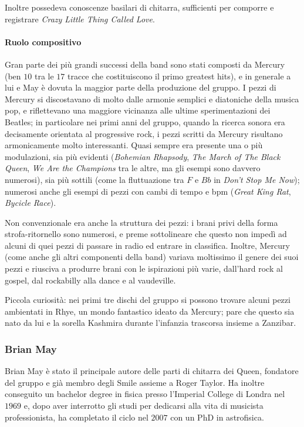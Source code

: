 \documentclass[12pt]{article}
\begin{document}
Inoltre possedeva conoscenze basilari di chitarra, sufficienti per comporre e registrare \emph{Crazy Little Thing Called Love}.

\paragraph{Ruolo compositivo}
Gran parte dei più grandi successi della band sono stati composti da Mercury (ben \(10\) tra le \(17\) tracce che costituiscono il primo greatest hits), e in generale a lui e May è dovuta la maggior parte della produzione del gruppo. I pezzi di Mercury si discostavano di molto dalle armonie semplici e diatoniche della musica pop, e riflettevano una maggiore vicinanza alle ultime sperimentazioni dei Beatles; in particolare nei primi anni del gruppo, quando la ricerca sonora era decisamente orientata al progressive rock, i pezzi scritti da Mercury risultano armonicamente molto interessanti. Quasi sempre era presente una o più modulazioni, sia più evidenti (\emph{Bohemian Rhapsody}, \emph{The March of The Black Queen}, \emph{We Are the Champions} tra le altre, ma gli esempi sono davvero numerosi), sia più sottili (come la fluttuazione tra \(F\) e \(Bb\) in \emph{Don't Stop Me Now}); numerosi anche gli esempi di pezzi con cambi di tempo e bpm (\emph{Great King Rat}, \emph{Bycicle Race}).

Non convenzionale era anche la struttura dei pezzi: i brani privi della forma strofa-ritornello sono numerosi, e preme sottolineare che questo non impedì ad alcuni di quei pezzi di passare in radio ed entrare in classifica. Inoltre, Mercury (come anche gli altri componenti della band) variava moltissimo il genere dei suoi pezzi e riusciva a produrre brani con le ispirazioni più varie, dall'hard rock al gospel, dal rockabilly alla dance e al vaudeville.

Piccola curiosità: nei primi tre dischi del gruppo si possono trovare alcuni pezzi ambientati in Rhye, un mondo fantastico ideato da Mercury; pare che questo sia nato da lui e la sorella Kashmira durante l'infanzia trascorsa insieme a Zanzibar.

\subsubsection{Brian May}
Brian May è stato il principale autore delle parti di chitarra dei Queen, fondatore del gruppo e già membro degli Smile assieme a Roger Taylor. Ha inoltre conseguito un bachelor degree in fisica presso l'Imperial College di Londra nel \(1969\) e, dopo aver interrotto gli studi per dedicarsi alla vita di musicista professionista, ha completato il ciclo nel \(2007\) con un PhD in astrofisica.
\end{document}
